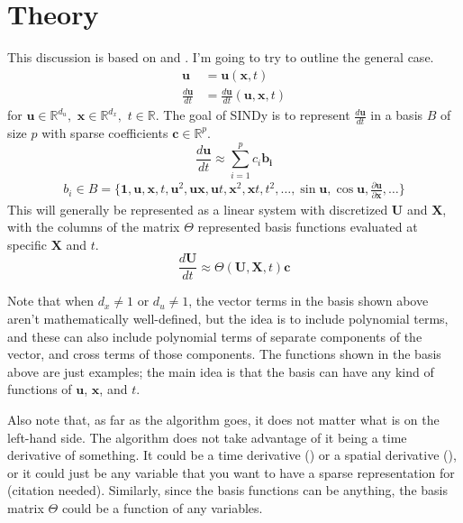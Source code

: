 \documentclass{article}
\let\vec\mathbf
\def\real{\mathbb{R}}
\begin{document}
\section{Theory}

This discussion is based on \cite{brunton2016sindy} and \cite{shea2020sindy-bvp}.
I'm going to try to outline the general case. 
\begin{align}
\vec{u} &= \vec{u}(\vec{x}, t) \\
\frac{d\vec{u}}{dt} &= \frac{d\vec{u}}{dt}(\vec{u}, \vec{x}, t)
\end{align}
for $\vec{u} \in \real^{d_u}, \,\, \vec{x} \in \real^{d_x}, \,\, t \in \real$.
The goal of SINDy is to represent $\frac{d\vec{u}}{dt}$ in a basis $B$ of size
$p$ with sparse coefficients $\vec{c} \in \real^p$.
\begin{equation}
\frac{d\vec{u}}{dt} \approx \sum_{i=1}^p c_i \vec{b_i}
\end{equation}
\begin{align}
b_i \in B = \{\vec{1}, \vec{u}, \vec{x}, t, \vec{u}^2, \vec{u}\vec{x},\vec{u}t,\vec{x}^2,\vec{x}t,t^2,\hdots,\sin\vec{u},\cos{\vec{u}}, \frac{\partial\vec{u}}{\partial \vec{x}},\hdots\}
\end{align}
This will generally be represented as a linear system with discretized $\vec{U}$
and $\vec{X}$, with the columns of the matrix $\Theta$ represented basis
functions evaluated at specific $\vec{X}$ and $t$.
\begin{equation}\label{eq:basis-system}
\frac{d\vec{U}}{dt} \approx \Theta(\vec{U}, \vec{X}, t) \vec{c}
\end{equation}

Note that when $d_x \ne 1$ or $d_u \ne 1$, the vector terms in the basis shown above
aren't mathematically well-defined, but the idea is to include polynomial terms,
and these can also include polynomial terms of separate components of the
vector, and cross terms of those components. The functions shown in the basis
above are just examples; the main idea is that the basis can have any kind of
functions of $\vec{u}$, $\vec{x}$, and $t$.

Also note that, as far as the algorithm goes, it does not matter what is on the
left-hand side. The algorithm does not take advantage of it being a time
derivative of something. It could be a time derivative (\cite{brunton2016sindy})
or a spatial derivative (\cite{shea2020sindy-bvp}), or it could just be any
variable that you want to have a sparse representation for (citation needed).
Similarly, since the basis functions can be anything, the basis matrix $\Theta$
could be a function of any variables.
\end{document}
